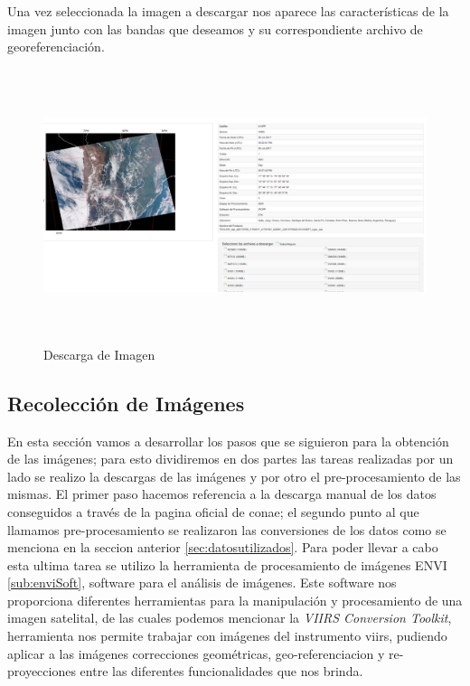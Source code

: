 Una vez seleccionada la imagen a descargar nos aparece las características de la imagen junto con las bandas que deseamos y su correspondiente archivo de georeferenciación.
\begin{figure}[H]
 \centering
  \includegraphics[height=8cm,keepaspectratio=true,clip=true]{imagenes/Apendice/conaepag3.png}
  \caption{Descarga de Imagen}
\end{figure}

\subsection{Recolección de Imágenes}\label{sub:recolecciondeimagen}

En esta sección vamos a desarrollar los pasos que se siguieron para la obtención de las imágenes; para esto dividiremos en dos partes las tareas realizadas por un lado se realizo la descargas de las imágenes y por otro el pre-procesamiento de las mismas. El primer paso hacemos  referencia a la descarga manual de los datos conseguidos a través de la pagina oficial de \ac{conae}; el segundo punto al que llamamos pre-procesamiento se realizaron las conversiones de los datos como se menciona en la seccion anterior \ref{sec:datosutilizados}. Para poder llevar a cabo esta ultima tarea se utilizo la herramienta de procesamiento de imágenes ENVI \ref{sub:enviSoft}, software para el análisis de imágenes. Este software nos proporciona diferentes herramientas para la manipulación y procesamiento  de  una imagen satelital, de las cuales podemos mencionar la \textit{VIIRS Conversion Toolkit}, herramienta nos permite trabajar con imágenes del instrumento \ac{viirs}, pudiendo aplicar a las imágenes correcciones geométricas, geo-referenciacion y re-proyecciones entre las diferentes funcionalidades que nos brinda. 

